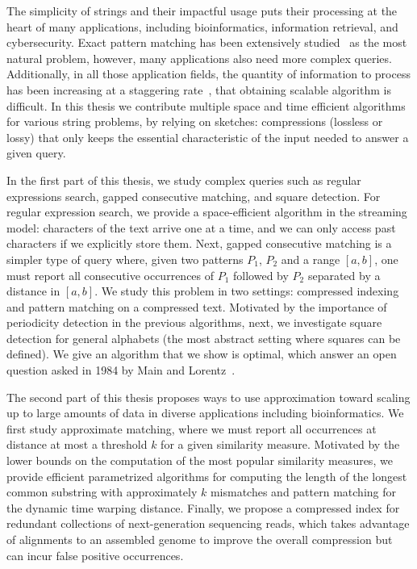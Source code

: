 The simplicity of strings and their impactful usage puts their processing at the heart of many applications, including bioinformatics, information retrieval, and cybersecurity. Exact pattern matching has been extensively studied~\cite{Charras2004} as the most natural problem, however, many applications also need more complex queries. Additionally, in all those application fields, the quantity of information to process has been increasing at a staggering rate~\cite{muir2016real}, that obtaining scalable algorithm is difficult.
In this thesis we contribute multiple space and time efficient algorithms for various string problems, by relying on sketches: compressions (lossless or lossy) that only keeps the essential characteristic of the input needed to answer a given query.%

In the first part of this thesis, we study complex queries such as regular expressions search, gapped consecutive matching, and square detection. 
For regular expression search, we provide a space-efficient algorithm in the streaming model: characters of the text arrive one at a time, and we can only access past characters if we explicitly store them. 
Next, gapped consecutive matching is a simpler type of query where, given two patterns $P_1$, $P_2$ and a range $[a,b]$, one must report all consecutive occurrences of $P_1$ followed by $P_2$ separated by a distance in $[a,b]$. We study this problem in two settings: compressed indexing and pattern matching on a compressed text.
Motivated by the importance of periodicity detection in the previous algorithms, next, we investigate square detection for general alphabets (the most abstract setting where squares can be defined). We give an algorithm that we show is optimal, which answer an open question asked in 1984 by Main and Lorentz~\cite{Main1984}.



The second part of this thesis proposes ways to use approximation toward scaling up to large amounts of data in diverse applications including bioinformatics.
We first study approximate matching, where we must report all occurrences at distance at most a threshold $k$ for a given similarity measure. Motivated by the lower bounds on the computation of the most popular similarity measures, we provide efficient parametrized algorithms for computing the length of the longest common substring with approximately $k$ mismatches and pattern matching for the dynamic time warping distance.
Finally, we propose a compressed index for redundant collections of next-generation sequencing reads, which takes advantage of alignments to an assembled genome to improve the overall compression but can incur false positive occurrences.

